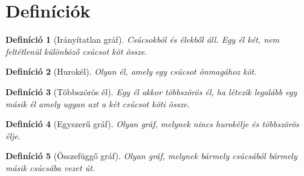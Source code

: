 \documentclass{article}
\newtheorem{definition}{Definíció}[section]
\begin{document}
\section{Definíciók}
\begin{definition}[Irányítatlan gráf]
    Csúcsokból és élekből áll. Egy él két, nem feltétlenül különböző csúcsot köt össze.
\end{definition}


\begin{definition}[Hurokél]
    Olyan él, amely egy csúcsot önmagához köt.
\end{definition}

\begin{center}
\end{center}


\begin{definition}[Többszörös él]
    Egy él akkor többszörös él, ha létezik legalább egy másik él amely ugyan azt a két csúcsot köti össze.
\end{definition}

\begin{center}
\end{center}


\begin{definition}[Egyszerű gráf]
    Olyan gráf, melynek nincs hurokélje és többszörös élje.
\end{definition}

\begin{definition}[Összefüggő gráf]
    Olyan gráf, melynek bármely csúcsából bármely másik csúcsába vezet út.
\end{definition}
\end{document}
